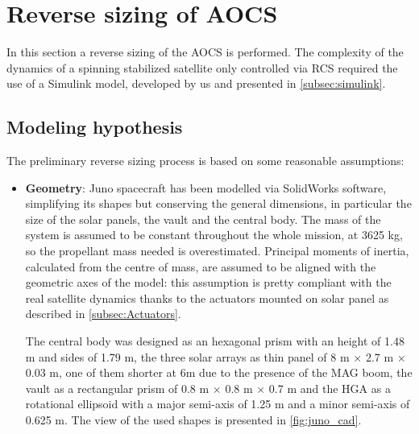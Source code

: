 \section{Reverse sizing of AOCS}
\label{sec:AOCS_sizing}

In this section a reverse sizing of the AOCS is performed. The complexity of the dynamics of a spinning stabilized satellite only controlled via RCS required the use of a Simulink model, developed by us and presented in \autoref{subsec:simulink}.
\subsection{Modeling hypothesis}
\label{subsec:mod_hypo}
The preliminary reverse sizing process is based on some reasonable assumptions:

\begin{itemize}
    \item
    \begin{minipage}[t]{0.6\linewidth}
        \textbf{Geometry}: Juno spacecraft has been modelled via SolidWorks software, simplifying its shapes but conserving the general dimensions, in particular the size of the solar panels, the vault and the central body. The mass of the system is assumed to be constant throughout the whole mission, at 3625 kg, so the propellant mass needed is overestimated.     
        Principal moments of inertia, calculated from the centre of mass, are assumed to be aligned with the geometric axes of the model: this assumption is pretty compliant with the real satellite dynamics thanks to the actuators mounted on solar panel as described in \autoref{subsec:Actuators}. 
       
        The central body was designed as an hexagonal prism with an height of 1.48 m and sides of 1.79 m, the three solar arrays as thin panel of 8 m $\times$ 2.7 m $\times$ 0.03 m, one of them shorter at 6m due to the presence of the MAG boom, the vault as a rectangular prism of 0.8 m $\times$ 0.8 m $\times$ 0.7 m and the HGA as a rotational ellipsoid with a major semi-axis of 1.25 m and a minor semi-axis of 0.625 m. 
        The view of the used shapes is presented in \autoref{fig:juno_cad}.
    \end{minipage}\hfill
    \begin{minipage}[t]{0.4\linewidth}
        \vspace*{-5mm}
    \end{minipage}


\end{itemize}
